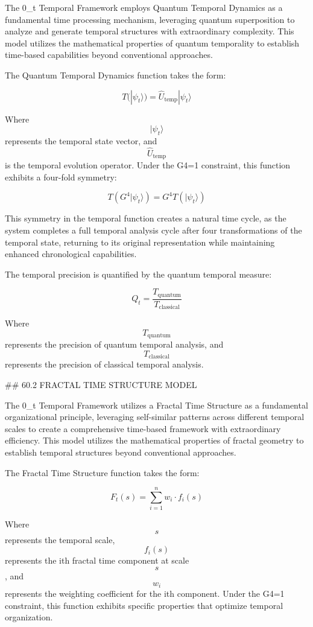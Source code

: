 The 0_t Temporal Framework employs Quantum Temporal Dynamics as a fundamental time processing mechanism, leveraging quantum superposition to analyze and generate temporal structures with extraordinary complexity. This model utilizes the mathematical properties of quantum temporality to establish time-based capabilities beyond conventional approaches.

The Quantum Temporal Dynamics function takes the form:

$$ T(|\psi_t\rangle) = \hat{U}_{\text{temp}} |\psi_t\rangle $$

Where $$ |\psi_t\rangle $$ represents the temporal state vector, and $$ \hat{U}_{\text{temp}} $$ is the temporal evolution operator. Under the G4=1 constraint, this function exhibits a four-fold symmetry:

$$ T(G^4 |\psi_t\rangle) = G^4 T(|\psi_t\rangle) $$

This symmetry in the temporal function creates a natural time cycle, as the system completes a full temporal analysis cycle after four transformations of the temporal state, returning to its original representation while maintaining enhanced chronological capabilities.

The temporal precision is quantified by the quantum temporal measure:

$$ Q_t = \frac{T_{\text{quantum}}}{T_{\text{classical}}} $$

Where $$ T_{\text{quantum}} $$ represents the precision of quantum temporal analysis, and $$ T_{\text{classical}} $$ represents the precision of classical temporal analysis.

## 60.2 FRACTAL TIME STRUCTURE MODEL

The 0_t Temporal Framework utilizes a Fractal Time Structure as a fundamental organizational principle, leveraging self-similar patterns across different temporal scales to create a comprehensive time-based framework with extraordinary efficiency. This model utilizes the mathematical properties of fractal geometry to establish temporal structures beyond conventional approaches.

The Fractal Time Structure function takes the form:

$$ F_t(s) = \sum_{i=1}^{n} w_i \cdot f_i(s) $$

Where $$ s $$ represents the temporal scale, $$ f_i(s) $$ represents the ith fractal time component at scale $$ s $$, and $$ w_i $$ represents the weighting coefficient for the ith component. Under the G4=1 constraint, this function exhibits specific properties that optimize temporal organization.

